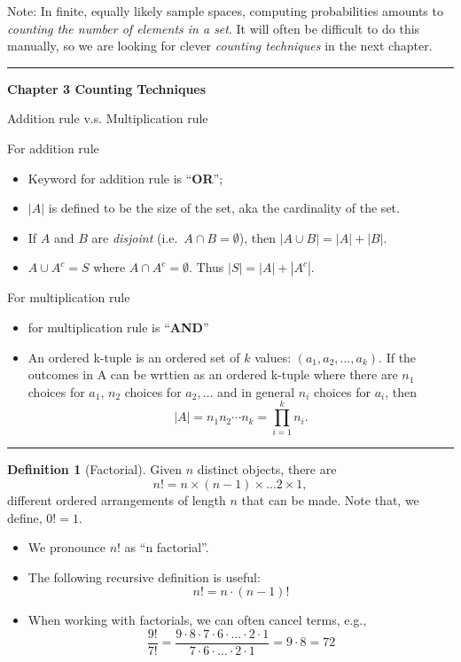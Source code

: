 \documentclass[
]{book}
\providecommand{\tightlist}{%
  \setlength{\itemsep}{0pt}\setlength{\parskip}{0pt}}
\theoremstyle{definition}
\newtheorem{definition}{Definition}[chapter]
\theoremstyle{definition}
\theoremstyle{definition}
\theoremstyle{definition}
\theoremstyle{remark}
\begin{document}
Note: In finite, equally likely sample spaces, computing probabilities amounts to \emph{counting the number of elements in a set}. It will often be difficult to do this manually, so we are looking for clever \emph{counting techniques} in the next chapter.

\begin{center}\rule{0.5\linewidth}{0.5pt}\end{center}

\textbf{Chapter 3 Counting Techniques}

Addition rule v.s. Multiplication rule

For addition rule

\begin{itemize}
\tightlist
\item
  Keyword for addition rule is ``\textbf{OR}'';
\item
  \(|A|\) is defined to be the size of the set, aka the cardinality of the set.
\item
  If \(A\) and \(B\) are \emph{disjoint} (i.e.~\(A\cap B = \emptyset\)), then \(|A\cup B| = |A| + |B|\).
\item
  \(A\cup A^c = S\) where \(A \cap A^c = \emptyset\). Thus \(|S|=|A|+|A^c|\).
\end{itemize}

For multiplication rule

\begin{itemize}
\tightlist
\item
  for multiplication rule is ``\textbf{AND}''
\item
  An ordered k-tuple is an ordered set of \(k\) values: \((a_1,a_2,\dots,a_k)\). If the outcomes in A can be wrttien as an ordered k-tuple where there are \(n_1\) choices for \(a_1\), \(n_2\) choices for \(a_2,\dots\) and in general \(n_i\) choices for \(a_i\), then
  \[
  |A| = n_1n_2\cdots n_k = \prod_{i=1}^k n_i.
    \]
\end{itemize}

\begin{center}\rule{0.5\linewidth}{0.5pt}\end{center}

\begin{definition}[Factorial]
Given \(n\) distinct objects, there are
\[
n! = n \times (n-1) \times \ldots 2 \times 1,
\]
different ordered arrangements of length \(n\) that can be made. Note that, we define, \(0! = 1\).
\end{definition}

\begin{itemize}
\tightlist
\item
  We pronounce \(n!\) as ``n factorial''.
\item
  The following recursive definition is useful:
  \[ 
  n! = n \cdot (n-1)!
  \]

  \item

  When working with factorials, we can often cancel terms, e.g.,
  \[ \frac{9!}{7!} = \frac{9\cdot 8 \cdot 7\cdot 6 \cdot \dots \cdot 2 \cdot 1}{7\cdot 6 \cdot \dots \cdot 2 \cdot 1}=9\cdot 8 = 72\]
\end{itemize}
\end{document}
